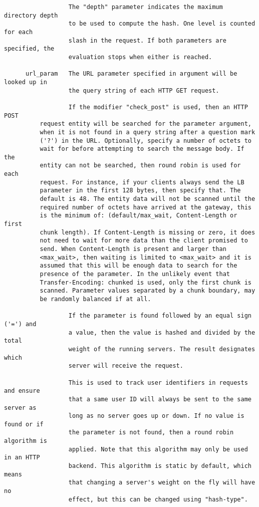 \begin{verbatim}
                  The "depth" parameter indicates the maximum directory depth
                  to be used to compute the hash. One level is counted for each
                  slash in the request. If both parameters are specified, the
                  evaluation stops when either is reached.

      url_param   The URL parameter specified in argument will be looked up in
                  the query string of each HTTP GET request.

                  If the modifier "check_post" is used, then an HTTP POST
		  request entity will be searched for the parameter argument,
		  when it is not found in a query string after a question mark
		  ('?') in the URL. Optionally, specify a number of octets to
		  wait for before attempting to search the message body. If the
		  entity can not be searched, then round robin is used for each
		  request. For instance, if your clients always send the LB
		  parameter in the first 128 bytes, then specify that. The
		  default is 48. The entity data will not be scanned until the
		  required number of octets have arrived at the gateway, this
		  is the minimum of: (default/max_wait, Content-Length or first
		  chunk length). If Content-Length is missing or zero, it does
		  not need to wait for more data than the client promised to
		  send. When Content-Length is present and larger than
		  <max_wait>, then waiting is limited to <max_wait> and it is
		  assumed that this will be enough data to search for the
		  presence of the parameter. In the unlikely event that
		  Transfer-Encoding: chunked is used, only the first chunk is
		  scanned. Parameter values separated by a chunk boundary, may
		  be randomly balanced if at all.

                  If the parameter is found followed by an equal sign ('=') and
                  a value, then the value is hashed and divided by the total
                  weight of the running servers. The result designates which
                  server will receive the request.

                  This is used to track user identifiers in requests and ensure
                  that a same user ID will always be sent to the same server as
                  long as no server goes up or down. If no value is found or if
                  the parameter is not found, then a round robin algorithm is
                  applied. Note that this algorithm may only be used in an HTTP
                  backend. This algorithm is static by default, which means
                  that changing a server's weight on the fly will have no
                  effect, but this can be changed using "hash-type".


\end{verbatim}
